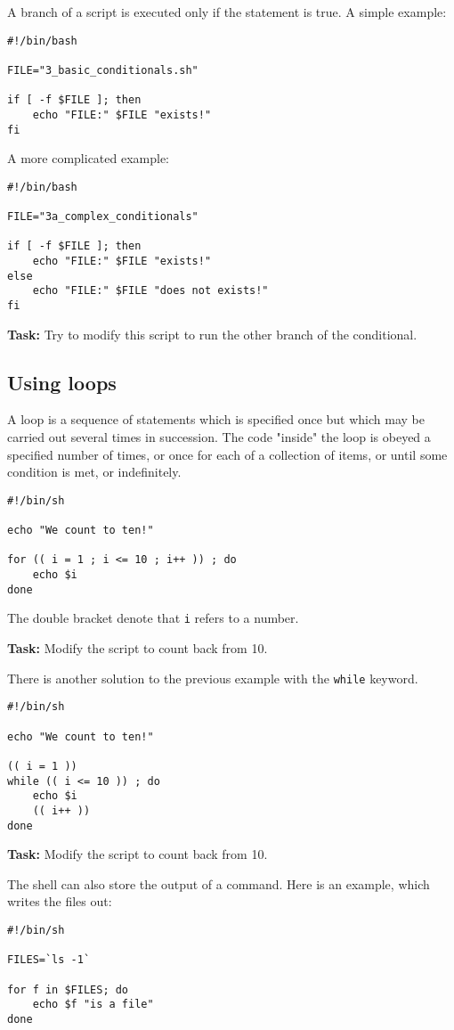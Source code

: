 \documentclass{article}\usepackage[]{graphicx}\usepackage[usenames,dvipsnames]{color}
\begin{document}
A branch of a script is executed only if the statement is true. A simple example:

\begin{verbatim}
#!/bin/bash

FILE="3_basic_conditionals.sh"

if [ -f $FILE ]; then
    echo "FILE:" $FILE "exists!"
fi
\end{verbatim}

A more complicated example:

\begin{verbatim}
#!/bin/bash

FILE="3a_complex_conditionals"

if [ -f $FILE ]; then
    echo "FILE:" $FILE "exists!"
else
    echo "FILE:" $FILE "does not exists!"
fi
\end{verbatim}

\textbf{Task:} Try to modify this script to run the other branch of the conditional.

\subsection*{Using loops}

A loop is a sequence of statements which is specified once but which may be carried out several times in succession. The code "inside" the loop is obeyed a specified number of times, or once for each of a collection of items, or until some condition is met, or indefinitely.

\begin{verbatim}
#!/bin/sh

echo "We count to ten!"

for (( i = 1 ; i <= 10 ; i++ )) ; do
    echo $i
done
\end{verbatim}

The double bracket denote that \verb+i+ refers to a number.

\textbf{Task:} Modify the script to count back from 10.

There is another solution to the previous example with the \verb+while+ keyword.

\begin{verbatim}
#!/bin/sh

echo "We count to ten!"

(( i = 1 ))
while (( i <= 10 )) ; do
    echo $i
    (( i++ ))
done
\end{verbatim}

\textbf{Task:} Modify the script to count back from 10.

The shell can also store the output of a command. Here is an example, which writes the files out:

\begin{verbatim}
#!/bin/sh

FILES=`ls -1`

for f in $FILES; do
    echo $f "is a file"
done
\end{verbatim}
\end{document}
